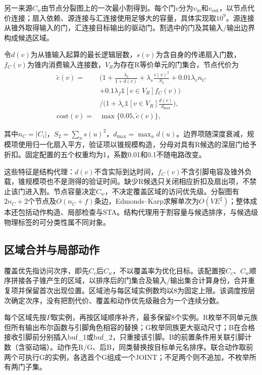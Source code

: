 \documentclass[twocolumn,10pt,fontset=windows]{ctexart}
\begin{document}
另一来源$C_w$由节点分裂图上的一次最小割得到。每个门$v$分为$v_{\mathrm{in}}$和$v_{\mathrm{out}}$，以节点代价连接；扇入依赖、源连接与汇连接使用足够大的容量，具体实现取$10^9$。源连接从锥外取得输入的门，汇连接目标输出的驱动门。割选中的门及其输入/输出边界构成候选区域。

令$d(v)$为从锥输入起算的最长逻辑层数，$s(v)$为含自身的传递扇入门数，$f_C(v)$为锥内消费输入连接数，$V_R$为存在R等价单元的门集合，节点代价为
{\small
\begin{equation}\label{eq:cost}
\begin{aligned}
\widetilde c(v)={}&\Big(1+\frac{\lambda_b}{1+d(v)}
+\lambda_s\frac{s(v)^2}{S_2}+0.01\lambda_v n_C\\
&+0.1\lambda_f\mathbb{1}[v\in V_R]f_C(v)\Big)\\
&\Big/\Big(1+\lambda_c\mathbb{1}[v\in V_R]\frac{d(v)}{d_{\max}}\Big),\\
\mathrm{cost}(v)={}&\max\{0.05,\widetilde c(v)\},
\end{aligned}
\end{equation}
}

其中$n_C=|C_i|$，$S_2=\sum_u s(u)^2$，$d_{\max}=\max_u d(u)$。边界项随深度衰减，规模项使用归一化扇入平方，验证项以锥规模构造，分母对具有R候选的深层门给予折扣。固定配置的五个权重均为1，系数0.01和0.1不随电路改变。

这些特征是结构代理：$d(v)$不含实际到达时间，$f_C(v)$不含引脚电容及锥外负载，锥规模项也不是测得的验证时间。缺少R候选只关闭相应折扣及扇出项，不禁止该门进入割。节点容量决定$C_w$，不决定覆盖区域的访问优先级。分裂图有$2n_C+2$个节点及$O(n_C+f)$条边，Edmonds--Karp求解单次为$O(VE^2)$；整体成本还包括动作构造、局部检查与STA。结构代理用于割容量与候选排序，与候选级物理标签的可分类性属不同对象。

\subsection{区域合并与局部动作}\label{sec:schedule}

覆盖优先指访问次序，即先$C_c$后$C_w$，不以覆盖率为优化目标。该配置按$C_c$、$C_w$顺序拼接各子锥产生的区域，以排序后的门集合及输入/输出集合计算身份，合并重复项并保留首次出现位置。区域池与每区域实例数均以8为固定上限。该调度按层次确定次序，没有把割代价、覆盖和动作优先级融合为一个连续分数。

每个区域先按$P$取实例，再按区域顺序补齐，最多保留8个实例。R枚举不同单元族但所有输出布尔函数与引脚角色相容的替换；G枚举同族更大驱动尺寸；B在合格接收引脚前分别插入buf\_1或buf\_2，只重接该引脚。B的前置条件用关联引脚计数（含驱动端）。动作先R/G、后B，同类替换按目标单元名排序。联合动作取前两个可执行G的实例，各选首个G组成一个JOINT；不足两个则不追加，不枚举所有两门子集。
\end{document}
